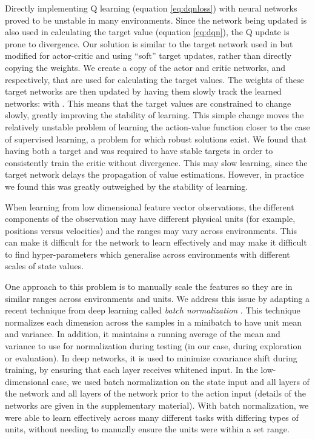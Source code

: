 \documentclass{article} \usepackage{iclr2016_conference,times}
\begin{document}
Directly implementing Q learning (equation \ref{eq:dqnloss}) with neural
networks proved to be unstable in many environments. Since the network
 being updated is also used in calculating the target value
(equation \ref{eq:dqn}),
the Q update is prone to divergence.
Our solution is similar to the
target network used in \citep{mnih2013playing} but modified for actor-critic
and using ``soft'' target updates, rather than directly copying the
weights. We
create a copy of the actor and critic networks, 
and  respectively, that are used for calculating
the target values.
The weights of these target networks
are then updated by having them slowly track the learned networks:
 with .
This means that the
target values are constrained to change slowly, greatly improving the
stability of learning. This simple
change moves the relatively unstable problem of
learning the action-value function closer to the case of
supervised learning,
a problem for which robust solutions exist.
We found that having both a target  and  was required
to have stable targets  in order to consistently
train the critic without divergence.
This may slow learning,
since the target network delays the propagation of value estimations. However,
in practice we found this was greatly outweighed by the stability of learning.

When learning from low dimensional feature vector observations, the different
components of the observation may have different physical units (for
example, positions versus velocities) and the ranges may vary
across environments. This can make it difficult for
the network to learn effectively and may make it difficult to find
hyper-parameters which generalise across environments with different
scales of state values.

One approach to
this problem is to manually scale the features so they are in similar
ranges across environments and units.
We address this issue by adapting a recent
technique from deep learning called \emph{batch normalization}
\citep{ioffe2015batch}. This technique normalizes each dimension
across the samples in a minibatch to have unit mean and variance.
In addition, it maintains a running average of the mean and variance to
use for normalization during testing
(in our case, during exploration or evaluation).
In deep networks, it is used to minimize covariance shift during training,
by ensuring that each layer receives whitened input.
In the low-dimensional case, we used batch
normalization on the state input and all layers of the  
network and all layers of the  network prior to the action input
(details of the networks are given in the supplementary material).
With batch normalization, we were able
to learn effectively across many different tasks with differing types
of units, without needing to manually ensure the units were within a
set range.
\end{document}
